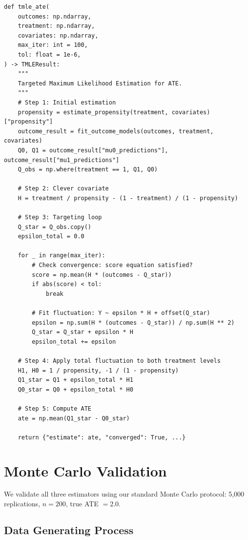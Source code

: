 \begin{verbatim}
def tmle_ate(
    outcomes: np.ndarray,
    treatment: np.ndarray,
    covariates: np.ndarray,
    max_iter: int = 100,
    tol: float = 1e-6,
) -> TMLEResult:
    """
    Targeted Maximum Likelihood Estimation for ATE.
    """
    # Step 1: Initial estimation
    propensity = estimate_propensity(treatment, covariates)["propensity"]
    outcome_result = fit_outcome_models(outcomes, treatment, covariates)
    Q0, Q1 = outcome_result["mu0_predictions"], outcome_result["mu1_predictions"]
    Q_obs = np.where(treatment == 1, Q1, Q0)

    # Step 2: Clever covariate
    H = treatment / propensity - (1 - treatment) / (1 - propensity)

    # Step 3: Targeting loop
    Q_star = Q_obs.copy()
    epsilon_total = 0.0

    for _ in range(max_iter):
        # Check convergence: score equation satisfied?
        score = np.mean(H * (outcomes - Q_star))
        if abs(score) < tol:
            break

        # Fit fluctuation: Y ~ epsilon * H + offset(Q_star)
        epsilon = np.sum(H * (outcomes - Q_star)) / np.sum(H ** 2)
        Q_star = Q_star + epsilon * H
        epsilon_total += epsilon

    # Step 4: Apply total fluctuation to both treatment levels
    H1, H0 = 1 / propensity, -1 / (1 - propensity)
    Q1_star = Q1 + epsilon_total * H1
    Q0_star = Q0 + epsilon_total * H0

    # Step 5: Compute ATE
    ate = np.mean(Q1_star - Q0_star)

    return {"estimate": ate, "converged": True, ...}
\end{verbatim}

\section{Monte Carlo Validation}
\label{sec:weighting_validation}

We validate all three estimators using our standard Monte Carlo protocol: 5,000 replications, $n = 200$, true ATE $= 2.0$.

\subsection{Data Generating Process}

